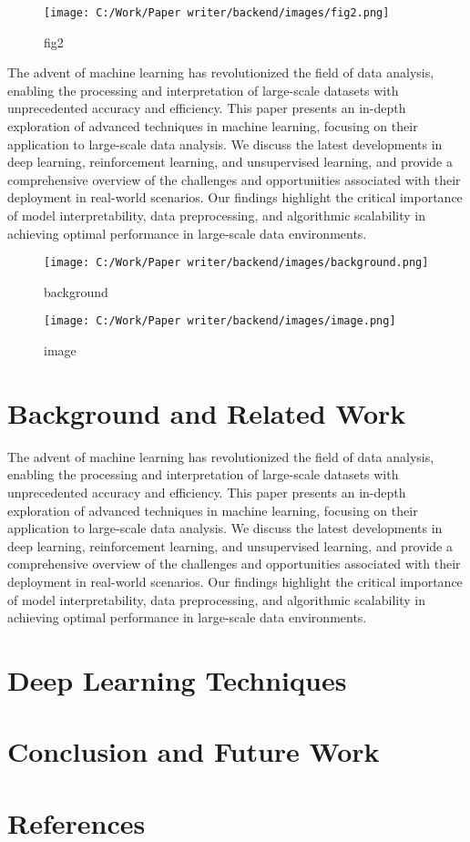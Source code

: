 \documentclass[conference]{IEEEtran}
\begin{document}
\begin{figure}[htbp]
\centering
\texttt{[image: C:/Work/Paper writer/backend/images/fig2.png]}
\caption{fig2}
\label{fig:undefined}
\end{figure}
The advent of machine learning has revolutionized the field of data analysis, enabling the processing and interpretation of large-scale datasets with unprecedented accuracy and efficiency. This paper presents an in-depth exploration of advanced techniques in machine learning, focusing on their application to large-scale data analysis. We discuss the latest developments in deep learning, reinforcement learning, and unsupervised learning, and provide a comprehensive overview of the challenges and opportunities associated with their deployment in real-world scenarios. Our findings highlight the critical importance of model interpretability, data preprocessing, and algorithmic scalability in achieving optimal performance in large-scale data environments.




\begin{figure}[htbp]
\centering
\texttt{[image: C:/Work/Paper writer/backend/images/background.png]}
\caption{background}
\label{fig:undefined}
\end{figure}


\begin{figure}[htbp]
\centering
\texttt{[image: C:/Work/Paper writer/backend/images/image.png]}
\caption{image}
\label{fig:undefined}
\end{figure}
\section{Background and Related Work}



The advent of machine learning has revolutionized the field of data analysis, enabling the processing and interpretation of large-scale datasets with unprecedented accuracy and efficiency. This paper presents an in-depth exploration of advanced techniques in machine learning, focusing on their application to large-scale data analysis. We discuss the latest developments in deep learning, reinforcement learning, and unsupervised learning, and provide a comprehensive overview of the challenges and opportunities associated with their deployment in real-world scenarios. Our findings highlight the critical importance of model interpretability, data preprocessing, and algorithmic scalability in achieving optimal performance in large-scale data environments.


\section{Deep Learning Techniques}



\section{Conclusion and Future Work}



\section{References}






\end{document}
